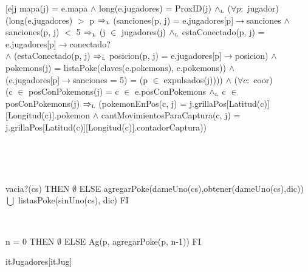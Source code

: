 \begin{Representacion}
	{j}{
		mapa(j) = e.mapa $\land$ long(e.jugadores) = ProxID(j) $\land_{\mathrm{\scriptscriptstyle{L}}}$ ($\forall p:$ jugador) \\
		(long(e.jugadores) $>$ p $\Rightarrow_{\mathrm{\scriptscriptstyle{L}}}$ (sanciones(p, j) = e.jugadores[p]$\rightarrow$sanciones $\land$ \\
		sanciones(p, j) $<$ 5 $\Rightarrow_{\mathrm{\scriptscriptstyle{L}}}$ (j $\in$ jugadores(j) $\land_{\mathrm{\scriptscriptstyle{L}}}$ estaConectado(p, j) = e.jugadores[p]$\rightarrow$conectado? \\
		$\land$ (estaConectado(p, j) $\Rightarrow_{\mathrm{\scriptscriptstyle{L}}}$ posicion(p, j) = e.jugadores[p]$\rightarrow$posicion) $\land$ \\
		pokemons(j) = listaPoke(claves(e.pokemons), e.pokemons)) $\land$ \\
		(e.jugadores[p]$\rightarrow$sanciones = 5) = (p $\in$ expulsados(j)))) $\land$ ($\forall c:$ coor) \\
		(c $\in$ posConPokemons(j) = c $\in$ e.posConPokemons $\land_{\mathrm{\scriptscriptstyle{L}}}$ c $\in$ posConPokemons(j) $\Rightarrow_{\mathrm{\scriptscriptstyle{L}}}$ (pokemonEnPos(c, j) = j.grillaPos[Latitud(c)][Longitud(c)].pokemon $\land$ cantMovimientosParaCaptura(c, j) = j.grillaPos[Latitud(c)][Longitud(c)].contadorCaptura))
	}
	
	~

		 
	~

	{\IF vacia?(cs) THEN
		$\emptyset$
	ELSE
		agregarPoke(dameUno(cs),obtener(dameUno(cs),dic)) $\bigcup$ listasPoke(sinUno(cs), dic)
	FI}
		
	~

	{\IF n = 0 THEN
		$\emptyset$
	ELSE
		Ag(p, agregarPoke(p, n-1))
	FI}



	\begin{Estructura}{itJugadores}[itJug]
		\begin{Tupla}[itJug]
		\end{Tupla}
	\end{Estructura}


	\begin{enumerate}


\end{enumerate}
\end{Representacion}
